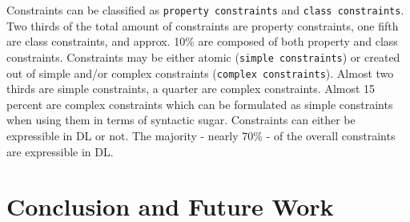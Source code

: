 \documentclass{llncs}
\newcommand{\ms}[1]{\texttt{#1}}
\newenvironment{evaluation-generic}{
  \scriptsize
  \sffamily
  \vspace{0cm}
	\begin{center}
  \begin{tabular}{l|c|c|c}
  \hline
  \textbf{constraint} & \textbf{property c.} & \textbf{simple c.} & \textbf{DL} \\
  \hline

}{
  \hline
  \end{tabular}
  \linebreak
	\end{center}
}
\begin{document}
Constraints can be classified as \ms{property constraints} and \ms{class constraints}.
Two thirds of the total amount of constraints are property constraints, one fifth are class constraints, and approx. 10\% are composed of both property and class constraints.
Constraints may be either atomic (\ms{simple constraints}) or created out of simple and/or complex constraints (\ms{complex constraints}).
Almost two thirds are simple constraints, a quarter are complex constraints.
Almost 15 percent are complex constraints which can be formulated as simple constraints when using them in terms of syntactic sugar.
Constraints can either be expressible in DL or not.
The majority - nearly 70\% - of the overall constraints are expressible in DL.

%

\section{Conclusion and Future Work}
\end{document}
